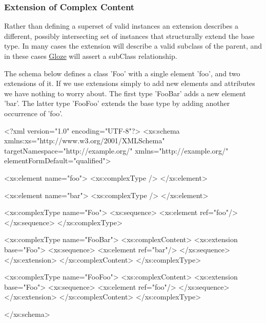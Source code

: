 \hypertarget{extensionComplexContent}{}\subsubsection{Extension of Complex Content}\label{extensionComplexContent}
Rather than defining a superset of valid instances an extension describes a different, possibly intersecting set of instances that structurally extend the base type. In many cases the extension will describe a valid subclass of the parent, and in these cases \hyperlink{classcom_1_1hp_1_1gloze_1_1_gloze}{Gloze} will assert a subClass relationship.

The schema below defines a class 'Foo' with a single element 'foo', and two extensions of it. If we use extensions simply to add new elements and attributes we have nothing to worry about. The first type 'FooBar' adds a new element 'bar'. The latter type 'FooFoo' extends the base type by adding another occurrence of 'foo'.


\begin{DoxyCodeInclude}
<?xml version="1.0" encoding="UTF-8"?>
<xs:schema xmlns:xs="http://www.w3.org/2001/XMLSchema" 
        targetNamespace="http://example.org/" xmlns="http://example.org/"
        elementFormDefault="qualified">
        
        <xs:element name="foo">
                <xs:complexType />
        </xs:element>

        <xs:element name="bar">
                <xs:complexType />
        </xs:element>
        
        <xs:complexType name="Foo">
                <xs:sequence>
                        <xs:element ref="foo"/>
                </xs:sequence>
        </xs:complexType>
        
        <xs:complexType name="FooBar">
                <xs:complexContent>
                        <xs:extension base="Foo">
                                <xs:sequence>
                                        <xs:element ref="bar"/>
                                </xs:sequence>
                        </xs:extension>
                </xs:complexContent>
        </xs:complexType>
        
        <xs:complexType name="FooFoo">
                <xs:complexContent>
                        <xs:extension base="Foo">
                                <xs:sequence>
                                        <xs:element ref="foo"/>
                                </xs:sequence>
                        </xs:extension>
                </xs:complexContent>
        </xs:complexType>       
        
</xs:schema>
\end{DoxyCodeInclude}


